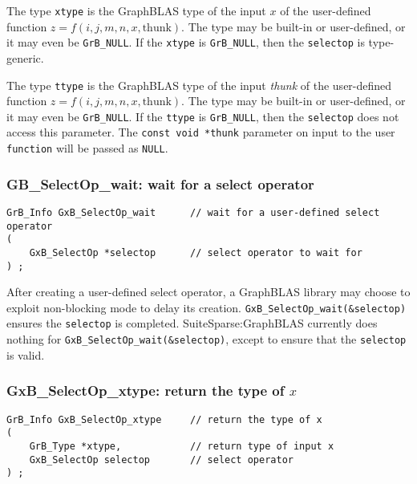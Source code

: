 \documentclass[12pt]{article}
\begin{document}
The type \verb'xtype' is the GraphBLAS type of the input $x$ of the
user-defined function $z=f(i,j,m,n,x,\mbox{thunk})$.  The type may be built-in
or user-defined, or it may even be \verb'GrB_NULL'.  If the \verb'xtype' is
\verb'GrB_NULL', then the \verb'selectop' is type-generic.

The type \verb'ttype' is the GraphBLAS type of the input {\em thunk} of the
user-defined function $z=f(i,j,m,n,x,\mbox{thunk})$.  The type may be built-in
or user-defined, or it may even be \verb'GrB_NULL'.  If the \verb'ttype' is
\verb'GrB_NULL', then the \verb'selectop' does not access this parameter.
The \verb'const void *thunk' parameter on input to the user \verb'function'
will be passed as \verb'NULL'.

\subsubsection{{\sf GB\_SelectOp\_wait:} wait for a select operator}

\begin{mdframed}[userdefinedwidth=6in]
{\footnotesize
\begin{verbatim}
GrB_Info GxB_SelectOp_wait      // wait for a user-defined select operator
(
    GxB_SelectOp *selectop      // select operator to wait for
) ;
\end{verbatim}
}\end{mdframed}

After creating a user-defined select operator, a GraphBLAS library may choose
to exploit non-blocking mode to delay its creation.
\verb'GxB_SelectOp_wait(&selectop)' ensures the \verb'selectop' is completed.
SuiteSparse:GraphBLAS currently does nothing for
\verb'GxB_SelectOp_wait(&selectop)', except to ensure that the \verb'selectop'
is valid.

\subsubsection{{\sf GxB\_SelectOp\_xtype:} return the type of $x$}
\label{selectop_xtype}

\begin{mdframed}[userdefinedwidth=6in]
{\footnotesize
\begin{verbatim}
GrB_Info GxB_SelectOp_xtype     // return the type of x
(
    GrB_Type *xtype,            // return type of input x
    GxB_SelectOp selectop       // select operator
) ;

\end{verbatim}
}\end{mdframed}
\end{document}

